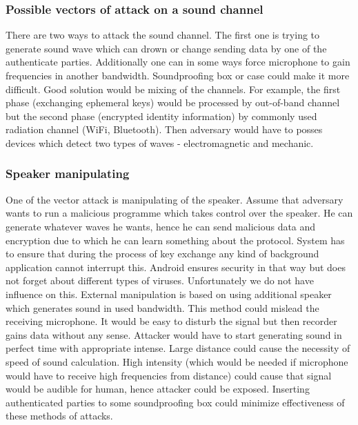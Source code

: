 \documentclass[11pt,titlepage]{article}
\theoremstyle{plain}
\begin{document}
\subsubsection{Possible vectors of attack on a sound channel}
There are two ways to attack the sound channel. The first one is trying to generate sound wave which can drown or change sending data by one of the authenticate parties. Additionally one can in some ways force microphone to gain frequencies in another bandwidth. Soundproofing box or case could make it more difficult. %
Good solution would be mixing of the channels. For example, the first phase (exchanging ephemeral keys) would be processed by out-of-band channel but the second phase (encrypted identity information) by commonly used radiation channel (WiFi, Bluetooth). Then adversary would have to posses devices which detect two types of waves - electromagnetic and mechanic.

\subsubsection{Speaker manipulating}
One of the vector attack is manipulating of the speaker. Assume that adversary wants to run a malicious programme which takes control over the speaker. He can generate whatever waves he wants, hence he can send malicious data and encryption due to which he can learn something about the protocol. System has to ensure that during the process of key exchange any kind of background application cannot interrupt this. Android ensures security in that way but does not forget about different types of viruses. Unfortunately we do not have influence on this. External manipulation is based on using additional speaker which generates sound in used bandwidth. This method could mislead the receiving microphone. It would be easy to disturb the signal but then recorder gains data without any sense. Attacker would have to start generating sound in perfect time with appropriate intense. Large distance could cause the necessity of speed of sound calculation. High intensity (which would be needed if microphone would have to receive high frequencies from distance) could cause that signal would be audible for human, hence attacker could be exposed. Inserting authenticated parties to some soundproofing box could minimize effectiveness of these methods of attacks.
\end{document}

